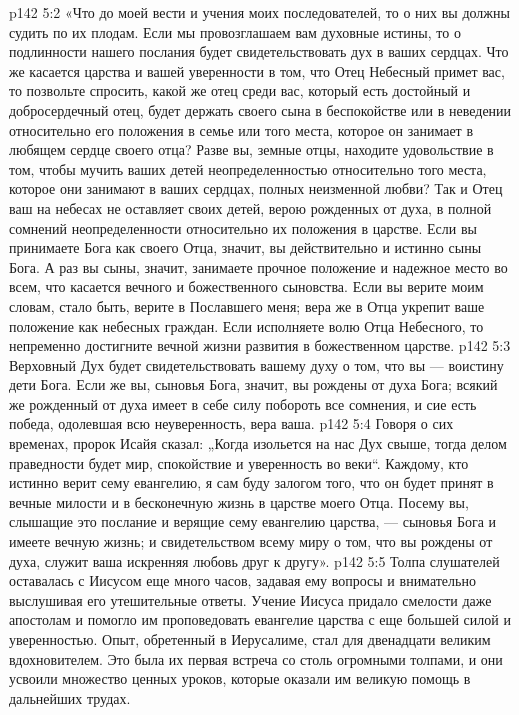 \vs p142 5:2 \pc «Что до моей вести и учения моих последователей, то о них вы должны судить по их плодам. Если мы провозглашаем вам духовные истины, то о подлинности нашего послания будет свидетельствовать дух в ваших сердцах. Что же касается царства и вашей уверенности в том, что Отец Небесный примет вас, то позвольте спросить, какой же отец среди вас, который есть достойный и добросердечный отец, будет держать своего сына в беспокойстве или в неведении относительно его положения в семье или того места, которое он занимает в любящем сердце своего отца? Разве вы, земные отцы, находите удовольствие в том, чтобы мучить ваших детей неопределенностью относительно того места, которое они занимают в ваших сердцах, полных неизменной любви? Так и Отец ваш на небесах не оставляет своих детей, верою рожденных от духа, в полной сомнений неопределенности относительно их положения в царстве. Если вы принимаете Бога как своего Отца, значит, вы действительно и истинно сыны Бога. А раз вы сыны, значит, занимаете прочное положение и надежное место во всем, что касается вечного и божественного сыновства. Если вы верите моим словам, стало быть, верите в Пославшего меня; вера же в Отца укрепит ваше положение как небесных граждан. Если исполняете волю Отца Небесного, то непременно достигните вечной жизни развития в божественном царстве.
\vs p142 5:3 Верховный Дух будет свидетельствовать вашему духу о том, что вы --- воистину дети Бога. Если же вы, сыновья Бога, значит, вы рождены от духа Бога; всякий же рожденный от духа имеет в себе силу побороть все сомнения, и сие есть победа, одолевшая всю неуверенность, вера ваша.
\vs p142 5:4 Говоря о сих временах, пророк Исайя сказал: „Когда изольется на нас Дух свыше, тогда делом праведности будет мир, спокойствие и уверенность во веки“. Каждому, кто истинно верит сему евангелию, я сам буду залогом того, что он будет принят в вечные милости и в бесконечную жизнь в царстве моего Отца. Посему вы, слышащие это послание и верящие сему евангелию царства, --- сыновья Бога и имеете вечную жизнь; и свидетельством всему миру о том, что вы рождены от духа, служит ваша искренняя любовь друг к другу».
\vs p142 5:5 \pc Толпа слушателей оставалась с Иисусом еще много часов, задавая ему вопросы и внимательно выслушивая его утешительные ответы. Учение Иисуса придало смелости даже апостолам и помогло им проповедовать евангелие царства с еще большей силой и уверенностью. Опыт, обретенный в Иерусалиме, стал для двенадцати великим вдохновителем. Это была их первая встреча со столь огромными толпами, и они усвоили множество ценных уроков, которые оказали им великую помощь в дальнейших трудах.
